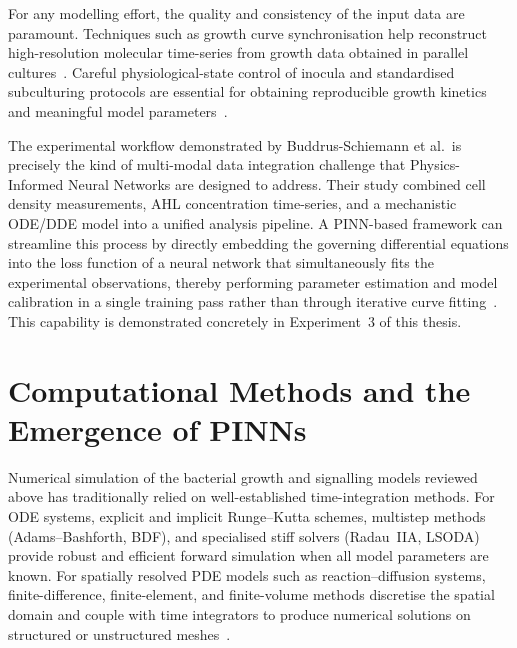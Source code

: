 \documentclass[14pt,a4paper,openany]{extbook}
\begin{document}
For any modelling effort, the quality and consistency of the input data are paramount. Techniques such as growth curve synchronisation help reconstruct high-resolution molecular time-series from growth data obtained in parallel cultures~\cite{vanDitmarsch2011}. Careful physiological-state control of inocula and standardised subculturing protocols are essential for obtaining reproducible growth kinetics and meaningful model parameters~\cite{baranyi1994}.

The experimental workflow demonstrated by Buddrus-Schiemann et al.\ is precisely the kind of multi-modal data integration challenge that Physics-Informed Neural Networks are designed to address. Their study combined cell density measurements, AHL concentration time-series, and a mechanistic ODE/DDE model into a unified analysis pipeline. A PINN-based framework can streamline this process by directly embedding the governing differential equations into the loss function of a neural network that simultaneously fits the experimental observations, thereby performing parameter estimation and model calibration in a single training pass rather than through iterative curve fitting~\cite{raissi2019, cuomo2022}. This capability is demonstrated concretely in Experiment~3 of this thesis.


\section{Computational Methods and the Emergence of PINNs}
\label{sec:pinnemergence}

Numerical simulation of the bacterial growth and signalling models reviewed above has traditionally relied on well-established time-integration methods. For ODE systems, explicit and implicit Runge--Kutta schemes, multistep methods (Adams--Bashforth, BDF), and specialised stiff solvers (Radau~IIA, LSODA) provide robust and efficient forward simulation when all model parameters are known. For spatially resolved PDE models such as reaction--diffusion systems, finite-difference, finite-element, and finite-volume methods discretise the spatial domain and couple with time integrators to produce numerical solutions on structured or unstructured meshes~\cite{cai2021}.
\end{document}
